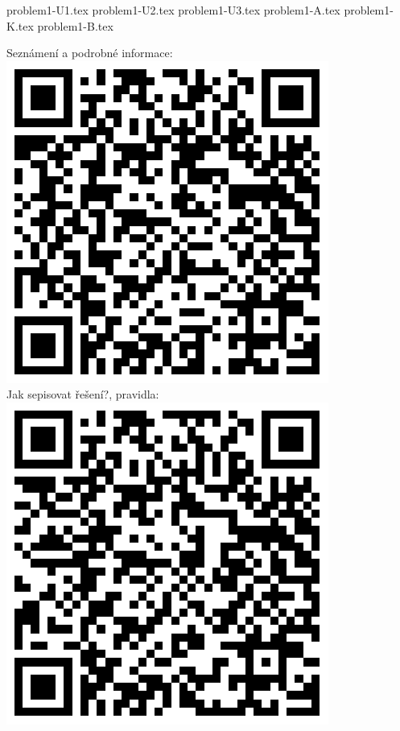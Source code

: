 \documentclass[12pt]{article}
\begin{document}
\newpage
{problem1-U1.tex}
\newpage
{problem1-U2.tex}
{problem1-U3.tex}
{problem1-A.tex}
{problem1-K.tex}
{problem1-B.tex}
\newpage

Seznámení a podrobné informace:\\
\includegraphics{../../../propagace/qrcodes/introduction.png}
\\

Jak sepisovat řešení?, pravidla:\\
\includegraphics{../../../propagace/qrcodes/instructions.png}
\\
\end{document}
